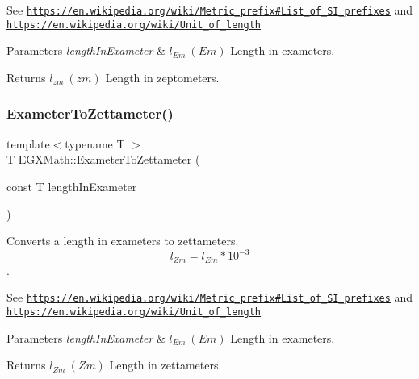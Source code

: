See \href{https://en.wikipedia.org/wiki/Metric_prefix#List_of_SI_prefixes}{\tt https\+://en.\+wikipedia.\+org/wiki/\+Metric\+\_\+prefix\#\+List\+\_\+of\+\_\+\+S\+I\+\_\+prefixes} and \href{https://en.wikipedia.org/wiki/Unit_of_length}{\tt https\+://en.\+wikipedia.\+org/wiki/\+Unit\+\_\+of\+\_\+length} 
\begin{DoxyParams}{Parameters}
{\em length\+In\+Exameter} & $ l_{Em}\ (Em)$ Length in exameters. \\
\hline
\end{DoxyParams}
\begin{DoxyReturn}{Returns}
$ l_{zm}\ (zm)$ Length in zeptometers. 
\end{DoxyReturn}
\mbox{\label{group___e_g_x_math-_conversions-_length_conversions-_s_i-_exameter-_s_i_gaa971cb3b6d17c5e7772d180b2606e42b}} 
\subsubsection{\texorpdfstring{Exameter\+To\+Zettameter()}{ExameterToZettameter()}}
{\footnotesize\ttfamily template$<$typename T $>$ \\
T E\+G\+X\+Math\+::\+Exameter\+To\+Zettameter (\begin{DoxyParamCaption}\item[{const T}]{length\+In\+Exameter }\end{DoxyParamCaption})}



Converts a length in exameters to zettameters. \[ l_{Zm}=l_{Em} * 10^{-3} \]. 

See \href{https://en.wikipedia.org/wiki/Metric_prefix#List_of_SI_prefixes}{\tt https\+://en.\+wikipedia.\+org/wiki/\+Metric\+\_\+prefix\#\+List\+\_\+of\+\_\+\+S\+I\+\_\+prefixes} and \href{https://en.wikipedia.org/wiki/Unit_of_length}{\tt https\+://en.\+wikipedia.\+org/wiki/\+Unit\+\_\+of\+\_\+length} 
\begin{DoxyParams}{Parameters}
{\em length\+In\+Exameter} & $ l_{Em}\ (Em)$ Length in exameters. \\
\hline
\end{DoxyParams}
\begin{DoxyReturn}{Returns}
$ l_{Zm}\ (Zm)$ Length in zettameters. 
\end{DoxyReturn}
